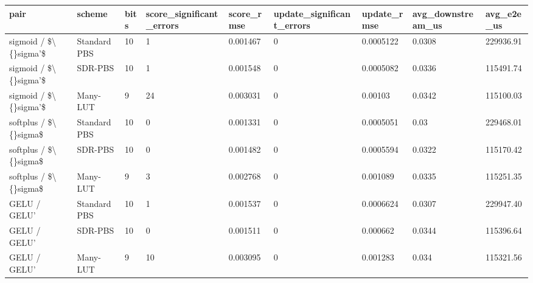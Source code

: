 \small
\setlength{\tabcolsep}{4pt}
\begin{tabular}{lllllllll}
\toprule
pair & scheme & bits & score\_significant\_errors & score\_rmse & update\_significant\_errors & update\_rmse & avg\_downstream\_us & avg\_e2e\_us \\
\midrule
sigmoid / \$\textbackslash\{\}sigma'\$ & Standard PBS & 10 & 1 & 0.001467 & 0 & 0.0005122 & 0.0308 & 229936.91 \\
sigmoid / \$\textbackslash\{\}sigma'\$ & SDR-PBS & 10 & 1 & 0.001548 & 0 & 0.0005082 & 0.0336 & 115491.74 \\
sigmoid / \$\textbackslash\{\}sigma'\$ & Many-LUT & 9 & 24 & 0.003031 & 0 & 0.00103 & 0.0342 & 115100.03 \\
softplus / \$\textbackslash\{\}sigma\$ & Standard PBS & 10 & 0 & 0.001331 & 0 & 0.0005051 & 0.03 & 229468.01 \\
softplus / \$\textbackslash\{\}sigma\$ & SDR-PBS & 10 & 0 & 0.001482 & 0 & 0.0005594 & 0.0322 & 115170.42 \\
softplus / \$\textbackslash\{\}sigma\$ & Many-LUT & 9 & 3 & 0.002768 & 0 & 0.001089 & 0.0335 & 115251.35 \\
GELU / GELU' & Standard PBS & 10 & 1 & 0.001537 & 0 & 0.0006624 & 0.0307 & 229947.40 \\
GELU / GELU' & SDR-PBS & 10 & 0 & 0.001511 & 0 & 0.000662 & 0.0344 & 115396.64 \\
GELU / GELU' & Many-LUT & 9 & 10 & 0.003095 & 0 & 0.001283 & 0.034 & 115321.56 \\
\bottomrule
\end{tabular}

